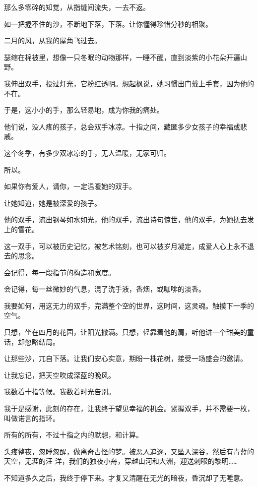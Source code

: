\documentclass[12pt,a4paper]{article}
\begin{document}
		那么多零碎的知觉，从指缝间流失，一去不返。

		如一把握不住的沙，不断地下落，下落。让你懂得珍惜分秒的相聚。


		二月的风，从我的屋角飞过去。

		瑟缩在棉被里，想像一只冬眠的动物那样，一睡不醒，直到淡紫的小花朵开遍山野。

		我伸出双手，投过灯光，它粉红透明。想起枫说，她习惯出门戴上手套，因为他的不在。

		于是，这小小的手，那么轻易地，成为你我的痛处。

		他们说，没人疼的孩子，总会双手冰凉。十指之间，藏匿多少女孩子的幸福或悲戚。

		这个冬季，有多少双冰凉的手，无人温暖，无家可归。


		所以。

		如果你有爱人，请你，一定温暖她的双手。

		让她知道，她是被深爱的孩子。


		他的双手，流出钢琴如水如光，他的双手，流出诗句惊世，他的双手，为她抚去发上的雪花。

		这一双手，可以被历史记忆，被艺术铭刻，也可以被岁月凝定，成爱人心上永不退去的思念。


		会记得，每一段指节的构造和宽度。

		会记得，每一丝微妙的气息，混了洗手液，香烟，或咖啡的淡香。


		我要如何，用这无力的双手，完满整个空的世界，这时间，这灵魂。触摸下一季的空气。

		只想，坐在四月的花园，让阳光撒满。只想，轻靠着他的肩，听他讲一个甜美的童话，却忽略结局。


		让那些沙，兀自下落。让我们安心实意，期盼一株花树，接受一场盛会的邀请。

		让我忘记，把天空吹成深蓝的晚风。


		我数着十指等候。我数着时光告别。

		我于是感谢，此刻的存在，让我终于望见幸福的机会。紧握双手，并不需要一枚，叫做诺言的指环。

		所有的所有，不过十指之内的默想，和计算。

	\endwriting



		头疼整夜，忽睡忽醒，做离奇古怪的梦。被恶人追逐，又坠入深谷，然后有青蓝的天空，无涯的汪
	洋，我们的独夜小舟，穿越山河和大洲，迎送刺眼的黎明……

		不知道多久之后，我终于停下来。才复又清醒在无光的暗夜，昏沉却了无睡意。
\end{document}
